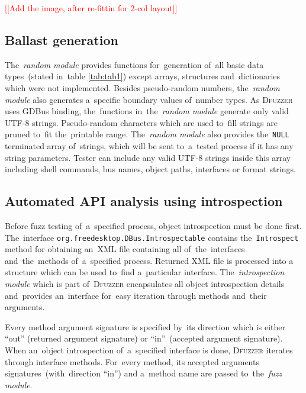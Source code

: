 \documentclass[conference]{IEEEtran}
\newcommand{\addtodo}[1]{\textcolor{red}{[[#1]]}}
\begin{document}
\addtodo{Add the image, after re-fittin for 2-col layout}

\subsection{Ballast generation}
The~\emph{random module} provides functions for~generation of~all basic data
types~(stated in~table \ref{tab:tab1}) except arrays, structures and~dictionaries
which were not implemented. Besides pseudo-random numbers, the~\emph{random module} also generates
a~specific boundary values of~number types.
As \textsc{Dfuzzer} uses GDBus binding, the~functions in~the~\emph{random module} generate
only valid UTF-8 strings. Pseudo-random characters which are used to~fill strings
are pruned to~fit the~printable range.
The~\emph{random module} also provides the~\texttt{NULL} terminated array of~strings,
which will be sent to~a~tested process if it has any string parameters. Tester
can include any valid UTF-8 strings inside this array including shell commands,
bus names, object paths, interfaces or format strings.

\subsection{Automated API analysis using introspection}
Before fuzz testing of~a~specified process, object introspection must be done
first. The~interface \texttt{org.freedesktop.DBus.Introspectable} contains
the~\texttt{Introspect} method for obtaining an~XML file containing all
of~the~interfaces and~the~methods of~a~specified process. Returned XML file is
processed into a structure which can be used to~find a~particular interface.
The~\emph{introspection module} which is part of~\textsc{Dfuzzer} encapsulates all
object introspection details and~provides an~interface for~easy iteration
through methods and~their arguments.


Every method argument signature is specified by~its
direction which is either ``out'' (returned argument signature) or
``in''~(accepted argument signature). When an~object introspection of~a~specified
interface is done, \textsc{Dfuzzer} iterates through interface methods. For~every method,
its accepted arguments signatures~(with~direction ``in'') and a~method name are
passed to~the~\emph{fuzz module}.
\end{document}
